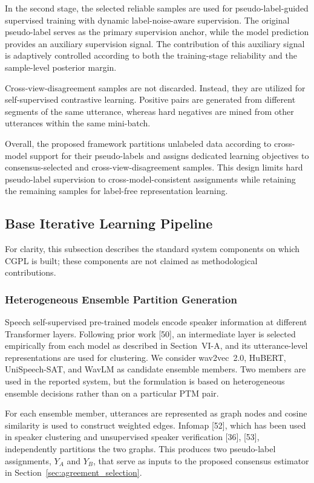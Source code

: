 \documentclass[journal]{IEEEtran}
\begin{document}
In the second stage, the selected reliable samples are used for pseudo-label-guided supervised training with dynamic label-noise-aware supervision. The original pseudo-label serves as the primary supervision anchor, while the model prediction provides an auxiliary supervision signal. The contribution of this auxiliary signal is adaptively controlled according to both the training-stage reliability and the sample-level posterior margin.

Cross-view-disagreement samples are not discarded. Instead, they are utilized for self-supervised contrastive learning. Positive pairs are generated from different segments of the same utterance, whereas hard negatives are mined from other utterances within the same mini-batch.

Overall, the proposed framework partitions unlabeled data according to cross-model support for their pseudo-labels and assigns dedicated learning objectives to consensus-selected and cross-view-disagreement samples. This design limits hard pseudo-label supervision to cross-model-consistent assignments while retaining the remaining samples for label-free representation learning.

\subsection{Base Iterative Learning Pipeline}

For clarity, this subsection describes the standard system components on
which CGPL is built; these components are not claimed as methodological
contributions.

\subsubsection{Heterogeneous Ensemble Partition Generation}

Speech self-supervised pre-trained models encode speaker information at
different Transformer layers. Following prior work [50], an intermediate
layer is selected empirically from each model as described in Section~VI-A,
and its utterance-level representations are used for clustering. We consider wav2vec~2.0, HuBERT,
UniSpeech-SAT, and WavLM as candidate ensemble members. Two members are used
in the reported system, but the formulation is based on heterogeneous
ensemble decisions rather than on a particular PTM pair.

For each ensemble member, utterances are represented as graph nodes and
cosine similarity is used to construct weighted edges. Infomap [52], which
has been used in speaker clustering and unsupervised speaker verification
[36], [53], independently partitions the two graphs. This produces two
pseudo-label assignments, $Y_A$ and $Y_B$, that serve as inputs to the
proposed consensus estimator in Section~\ref{sec:agreement_selection}.
\end{document}
